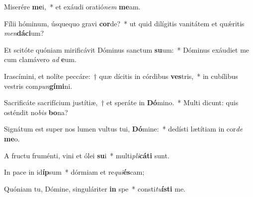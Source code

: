 \item Miserére \textbf{me}i,~* et exáudi oratió\textit{nem} \textbf{me}am.
\item Fílii hóminum, úsquequo gravi \textbf{cor}de?~* ut quid dilígitis vanitátem et quǽritis \textit{men}\textbf{dá}\textbf{ci}um?
\item Et scitóte quóniam mirificávit Dóminus sanctum \textbf{su}um:~* Dóminus exáudiet me cum clamávero \textit{ad} \textbf{e}um.
\item Irascímini, et nolíte peccáre:~† quæ dícitis in córdibus \textbf{ves}tris,~* in cubílibus vestris com\textit{pun}\textbf{gí}\textbf{mi}ni.
\item Sacrificáte sacrifícium justítiæ,~† et speráte in \textbf{Dó}mino.~* Multi dicunt: quis osténdit no\textit{bis} \textbf{bo}na?
\item Signátum est super nos lumen vultus tui, \textbf{Dó}mine:~* dedísti lætítiam in cor\textit{de} \textbf{me}o.
\item A fructu fruménti, vini et ólei \textbf{su}i~* multi\textit{pli}\textbf{cá}\textbf{ti} sunt.
\item In pace in id\textbf{íp}sum~* dórmiam et re\textit{qui}\textbf{és}cam;
\item Quóniam tu, Dómine, singuláriter \textbf{in} spe~* consti\textit{tu}\textbf{ís}\textbf{ti} me.
